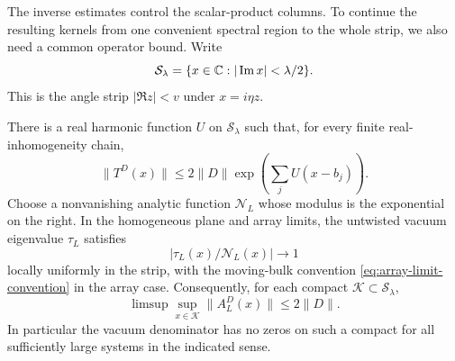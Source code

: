 The inverse estimates control the scalar-product columns.
To continue the resulting kernels from one convenient spectral
region to the whole strip, we also need a common operator bound.
Write
\[
 \mathcal S_\lambda=\{x\in\mathbb C:|\operatorname{Im} x|<\lambda/2\}.
\]
This is the angle strip $|\Re z|<v$ under $x=i\eta z$.

\begin{lemma}\label{lem:row-normalization}
There is a real harmonic function $U$ on $\mathcal S_\lambda$
such that, for every finite real-inhomogeneity chain,
\begin{equation}\label{eq:harmonic-row-bound}
 \|T^D(x)\|\le2\|D\|
                 \exp\left(\sum_jU(x-b_j)\right).
\end{equation}
Choose a nonvanishing analytic function $\mathcal N_L$ whose
modulus is the exponential on the right.  In the homogeneous plane
and array limits, the untwisted vacuum eigenvalue $\tau_L$ satisfies
\begin{equation}\label{eq:vacuum-modulus-normalization}
 |\tau_L(x)/\mathcal N_L(x)|\longrightarrow1
\end{equation}
locally uniformly in the strip, with the moving-bulk convention
\eqref{eq:array-limit-convention} in the array case.
Consequently, for each compact $\mathcal K\subset\mathcal S_\lambda$,
\begin{equation}\label{eq:normalized-row-bound}
 \limsup\sup_{x\in\mathcal K}\|A_L^D(x)\|\le2\|D\|.
\end{equation}
In particular the vacuum denominator has no zeros on such a compact
for all sufficiently large systems in the indicated sense.
\end{lemma}

